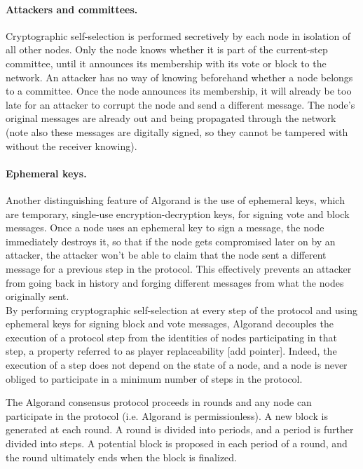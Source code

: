 \paragraph{Attackers and committees.} Cryptographic self-selection is performed secretively by each node in isolation of all other nodes. Only the node knows whether it is part of the current-step committee, until it announces its membership with its vote or block to the network. An attacker has no way of knowing beforehand whether a node belongs to a committee. Once the node announces its membership, it will already be too late for an attacker to corrupt the node and send a different message. The node's original messages are already out and being propagated through the network (note also these messages are digitally signed, so they cannot be tampered with without the receiver knowing).

\paragraph{Ephemeral keys.} Another distinguishing feature of Algorand is the use of ephemeral keys, which are temporary, single-use encryption-decryption keys, for signing vote and block messages. Once a node uses an ephemeral key to sign a message, the node immediately destroys it, so that if the node gets compromised later on by an attacker, the attacker won't be able to claim that the node sent a different message for a previous step in the protocol. This effectively prevents an attacker from going back in history and forging different messages from what the nodes originally sent.\\

\noindent By performing cryptographic self-selection at every step of the protocol and using ephemeral keys for signing block and vote messages, Algorand decouples the execution of a protocol step from the identities of nodes participating in that step, a property referred to as player replaceability [add pointer]. Indeed, the execution of a step does not depend on the state of a node, and a node is never obliged to participate in a minimum number of steps in the protocol.

The Algorand consensus protocol proceeds in rounds and any node can participate in the protocol (i.e. Algorand is permissionless). A new block is generated at each round. A round is divided into periods, and a period is further divided into steps. A potential block is proposed in each period of a round, and the round ultimately ends when the block is finalized.

